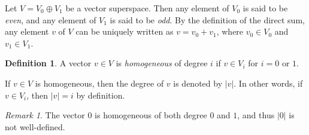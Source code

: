 \documentclass[12pt]{article}
\theoremstyle{definition}
\newtheorem{dfn}{Definition}
\theoremstyle{remark}
\newtheorem*{rmk}{Remark}
\begin{document}
Let $V = V_0 \oplus V_1$ be a vector superspace.  Then any element of $V_0$ is said to be \emph{even}, and any element of $V_1$ is said to be \emph{odd}.  By the definition of the direct sum, any element $v$ of $V$ can be uniquely written as $v = v_0 + v_1$, where $v_0 \in V_0$ and $v_1 \in V_1$.

\begin{dfn}
A vector $v \in V$ is \emph{homogeneous} of degree $i$ if $v \in V_i$ for $i = 0$ or $1$.
\end{dfn}

If $v \in V$ is homogeneous, then the degree of $v$ is denoted by $|v|$.  In other words, if $v \in V_i$, then $|v| = i$ by definition.

\begin{rmk}
The vector $0$ is homogeneous of both degree $0$ and $1$, and thus $|0|$ is not well-defined.
\end{rmk}


\end{document}
